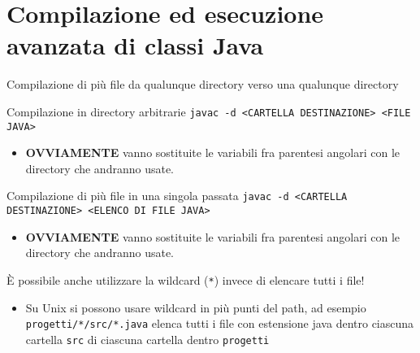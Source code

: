 \documentclass[presentation]{beamer}
\begin{document}
\section{Compilazione ed esecuzione avanzata di classi Java}


\begin{frame}{Compilazione di più file da qualunque directory verso una qualunque directory}
  \begin{block}{Compilazione in directory arbitrarie}
    \texttt{javac -d <CARTELLA DESTINAZIONE> <FILE JAVA>}
    \begin{itemize}
      \item \textbf{OVVIAMENTE} vanno sostituite le variabili fra parentesi angolari con le 
directory che andranno usate.
    \end{itemize}
  \end{block}
  \begin{block}{Compilazione di più file in una singola passata}
    \texttt{javac -d <CARTELLA DESTINAZIONE> <ELENCO DI FILE JAVA>}
    \begin{itemize}
      \item \textbf{OVVIAMENTE} vanno sostituite le variabili fra parentesi angolari con le 
directory che andranno usate.
    \end{itemize}
  \end{block}
  È possibile anche utilizzare la wildcard (\texttt{*}) invece di elencare tutti i file!
  \begin{itemize}
    \item Su Unix si possono usare wildcard in più punti del path, ad esempio 
\texttt{progetti/*/src/*.java} elenca tutti i file con estensione java dentro ciascuna cartella 
\texttt{src} di ciascuna cartella dentro \texttt{progetti}
  \end{itemize}
\end{frame}
\end{document}
